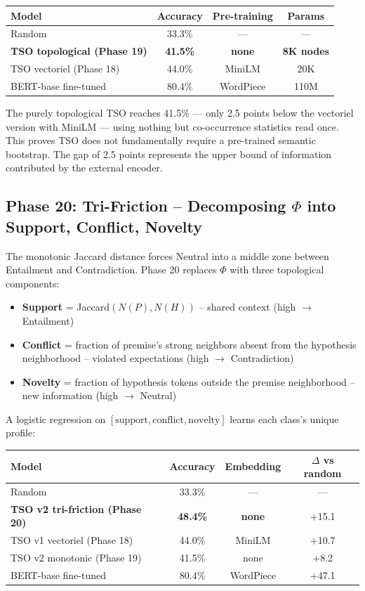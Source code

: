 \documentclass{article}
\begin{document}
\begin{center}
\begin{tabular}{lccc}
\toprule
Model & Accuracy & Pre-training & Params \\
\midrule
Random & 33.3\% & --- & --- \\
\textbf{TSO topological (Phase 19)} & \textbf{41.5\%} & \textbf{none} & \textbf{8K nodes} \\
TSO vectoriel (Phase 18) & 44.0\% & MiniLM & 20K \\
BERT-base fine-tuned & 80.4\% & WordPiece & 110M \\
\bottomrule
\end{tabular}
\end{center}

The purely topological TSO reaches 41.5\% --- only 2.5 points below the vectoriel version with MiniLM --- using nothing but co-occurrence statistics read once. This proves TSO does not fundamentally require a pre-trained semantic bootstrap. The gap of 2.5 points represents the upper bound of information contributed by the external encoder.

\subsection{Phase 20: Tri-Friction -- Decomposing $\Phi$ into Support, Conflict, Novelty}

The monotonic Jaccard distance forces Neutral into a middle zone between Entailment and Contradiction. Phase 20 replaces $\Phi$ with three topological components:

\begin{itemize}
    \item \textbf{Support} = Jaccard$(N(P), N(H))$ -- shared context (high $\to$ Entailment)
    \item \textbf{Conflict} = fraction of premise's strong neighbors absent from the hypothesis neighborhood -- violated expectations (high $\to$ Contradiction)
    \item \textbf{Novelty} = fraction of hypothesis tokens outside the premise neighborhood -- new information (high $\to$ Neutral)
\end{itemize}

A logistic regression on $[\text{support}, \text{conflict}, \text{novelty}]$ learns each class's unique profile:

\begin{center}
\begin{tabular}{lccc}
\toprule
Model & Accuracy & Embedding & $\Delta$ vs random \\
\midrule
Random & 33.3\% & --- & --- \\
\textbf{TSO v2 tri-friction (Phase 20)} & \textbf{48.4\%} & \textbf{none} & +15.1 \\
TSO v1 vectoriel (Phase 18) & 44.0\% & MiniLM & +10.7 \\
TSO v2 monotonic (Phase 19) & 41.5\% & none & +8.2 \\
BERT-base fine-tuned & 80.4\% & WordPiece & +47.1 \\
\bottomrule
\end{tabular}
\end{center}
\end{document}
